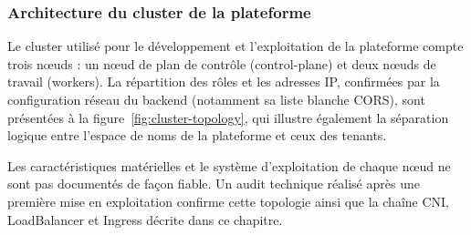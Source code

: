 \subsubsection{Architecture du cluster de la plateforme}

Le cluster utilisé pour le développement et l'exploitation de la plateforme compte trois nœuds : un nœud de plan de contrôle (control-plane) et deux nœuds de travail (workers). La répartition des rôles et les adresses IP, confirmées par la configuration réseau du backend (notamment sa liste blanche CORS), sont présentées à la figure~\ref{fig:cluster-topology}, qui illustre également la séparation logique entre l'espace de noms de la plateforme et ceux des tenants.

Les caractéristiques matérielles et le système d'exploitation de chaque nœud ne sont pas documentés de façon fiable. Un audit technique réalisé après une première mise en exploitation confirme cette topologie ainsi que la chaîne CNI, LoadBalancer et Ingress décrite dans ce chapitre.

